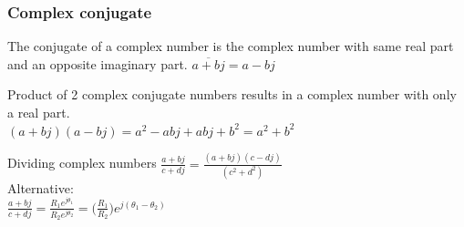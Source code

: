 \begin{frame}
	\frametitle{Complex conjugate}
	\begin{definition}
		The conjugate of a complex number is the complex number with same real part and an opposite imaginary part.
		$\overline{a+bj} = a-bj$
	\end{definition}
	Product of 2 complex conjugate numbers results in a complex number with only a real part.\\
	$(a + bj)(a-bj) = a^2 - abj + abj + b^2= a^2 +b^2$\\
	\begin{block}{Dividing complex numbers}
			$\frac{a+bj}{c+dj} = \frac{(a+bj)(c-dj)}{(c^2+d^2)}$\\
			Alternative:\\
			$\frac{a+bj}{c+dj} = \frac{R_1 e^{j\theta_1}}{R_2 e^{j \theta_2}} = \big(\frac{R_1}{R_2}\big) e^{j(\theta_1-\theta_2)}$
	\end{block}

\end{frame}